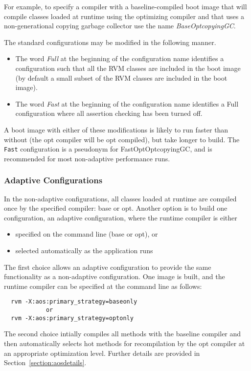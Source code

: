 For example, to specify a compiler with a baseline-compiled boot image
that will 
compile classes loaded at runtime using the optimizing compiler and that uses
a non-generational copying garbage collector use the name 
{\em BaseOptcopyingGC}.

The standard configurations may be modified in the following manner. 
\begin{itemize}
\item The word 
{\em Full} at the beginning of the configuration name identifies a 
configuration
such that all the RVM classes are included in the boot image (by default
a small subset of the RVM classes are included in the boot image). 
\item The word
{\em Fast} at the beginning of the configuration name identifies a Full
configuration where all assertion checking has been turned off. 
\end{itemize}
A boot image with
either of these modifications is likely to run faster than without
(the opt compiler will be opt compiled),
but take longer to build.  The {\tt
Fast} configuration is a pseudonym for FastOptOptcopyingGC, and is
recommended for most non-adaptive performance runs.

\subsubsection{Adaptive Configurations} \label{adaptive-configs}
In the non-adaptive configurations, all classes
loaded at runtime are compiled once by the specified
compiler: base or opt.  Another option is to build one configuration,
an adaptive configuration,
where the runtime compiler is either
\begin{itemize}
\item specified on the command line (base or opt), or
\item selected automatically as the application runs
\end{itemize}

The first choice allows an adaptive configuration to provide the same
functionality as a non-adaptive configuration.  One image is built,
and the runtime compiler can be specified at the command line as
follows:
\begin{verbatim}
  rvm -X:aos:primary_strategy=baseonly
            or
  rvm -X:aos:primary_strategy=optonly
\end{verbatim}

The second choice intially compiles all methods with the
baseline compiler and then automatically selects hot methods for
recompilation by the opt compiler at an appropriate optimization
level. Further details are provided in Section~\ref{section:aosdetails}.

